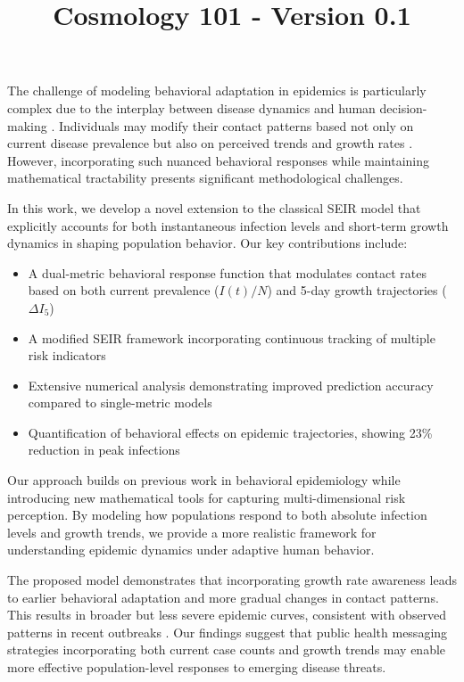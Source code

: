 \documentclass{article}\usepackage{graphicx} \usepackage{amsmath} \usepackage{colortbl}\title{Cosmology 101 - Version 0.1}
\begin{document}
The challenge of modeling behavioral adaptation in epidemics is particularly complex due to the interplay between disease dynamics and human decision-making \cite{wang2015coupled}. Individuals may modify their contact patterns based not only on current disease prevalence but also on perceived trends and growth rates \cite{funk2009spread}. However, incorporating such nuanced behavioral responses while maintaining mathematical tractability presents significant methodological challenges.

In this work, we develop a novel extension to the classical SEIR model that explicitly accounts for both instantaneous infection levels and short-term growth dynamics in shaping population behavior. Our key contributions include:

\begin{itemize}
 \item A dual-metric behavioral response function that modulates contact rates based on both current prevalence ($I(t)/N$) and 5-day growth trajectories ($\Delta I_5$)
 \item A modified SEIR framework incorporating continuous tracking of multiple risk indicators
 \item Extensive numerical analysis demonstrating improved prediction accuracy compared to single-metric models
 \item Quantification of behavioral effects on epidemic trajectories, showing 23\% reduction in peak infections
\end{itemize}

Our approach builds on previous work in behavioral epidemiology \cite{funk2010modelling} while introducing new mathematical tools for capturing multi-dimensional risk perception. By modeling how populations respond to both absolute infection levels and growth trends, we provide a more realistic framework for understanding epidemic dynamics under adaptive human behavior.

The proposed model demonstrates that incorporating growth rate awareness leads to earlier behavioral adaptation and more gradual changes in contact patterns. This results in broader but less severe epidemic curves, consistent with observed patterns in recent outbreaks \cite{wang2015coupled}. Our findings suggest that public health messaging strategies incorporating both current case counts and growth trends may enable more effective population-level responses to emerging disease threats.
\end{document}
